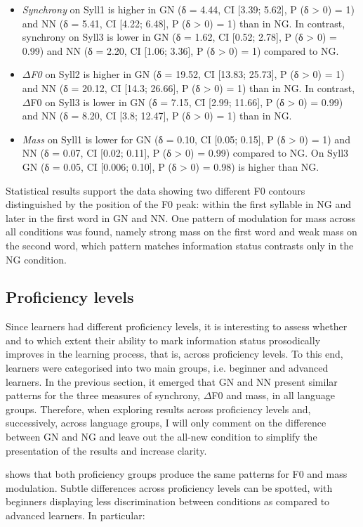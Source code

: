 \begin{itemize}
\item \textit{Synchrony} on Syll1 is higher in GN (δ = 4.44, CI [3.39; 5.62], P (δ > 0) = 1) and NN (δ = 5.41, CI [4.22; 6.48], P (δ > 0) = 1) than in NG. In contrast, synchrony on Syll3 is lower in GN (δ = 1.62, CI [0.52; 2.78], P (δ > 0) = 0.99) and NN (δ = 2.20, CI [1.06; 3.36], P (δ > 0) = 1) compared to NG.
\item \textit{${\Delta}$F0} on Syll2 is higher in GN (δ = 19.52, CI [13.83; 25.73], P (δ > 0) = 1) and NN (δ = 20.12, CI [14.3; 26.66], P (δ > 0) = 1) than in NG. In contrast, ${\Delta}$F0 on Syll3 is lower in GN (δ = 7.15, CI [2.99; 11.66], P (δ > 0) = 0.99) and NN (δ = 8.20, CI [3.8; 12.47], P (δ > 0) = 1) than in NG.
\item \textit{Mass} on Syll1 is lower for GN (δ = 0.10, CI [0.05; 0.15], P (δ > 0) = 1) and NN (δ = 0.07, CI [0.02; 0.11], P (δ > 0) = 0.99) compared to NG. On Syll3 GN (δ = 0.05, CI [0.006; 0.10], P (δ > 0) = 0.98) is higher than NG.
\end{itemize}

Statistical results support the data showing two different F0 contours distinguished by the position of the F0 peak: within the first syllable in NG and later in the first word in GN and NN. One pattern of modulation for mass across all conditions was found, namely strong mass on the first word and weak mass on the second word, which pattern matches information status contrasts only in the NG condition.

\subsection{Proficiency levels}
\label{sec:2.6.1}
Since learners had different proficiency levels, it is interesting to assess whether and to which extent their ability to mark information status prosodically improves in the learning process, that is, across proficiency levels. To this end, learners were categorised into two main groups, i.e. beginner and advanced learners. In the previous section, it emerged that GN and NN present similar patterns for the three measures of synchrony, ${\Delta}$F0 and mass, in all language groups. Therefore, when exploring results across proficiency levels and, successively, across language groups, I will only comment on the difference between GN and NG and leave out the all-new condition to simplify the presentation of the results and increase clarity.

 shows that both proficiency groups produce the same patterns for F0 and mass modulation. Subtle differences across proficiency levels can be spotted, with beginners displaying less discrimination between conditions as compared to advanced learners. In particular:

